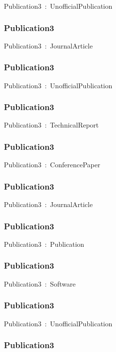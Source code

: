 \documentclass{article}
\begin{document}
Publication3~:~UnofficialPublication

\subsubsection*{Publication3}

Publication3~:~JournalArticle

\subsubsection*{Publication3}

Publication3~:~UnofficialPublication

\subsubsection*{Publication3}

Publication3~:~TechnicalReport

\subsubsection*{Publication3}

Publication3~:~ConferencePaper

\subsubsection*{Publication3}

Publication3~:~JournalArticle

\subsubsection*{Publication3}

Publication3~:~Publication

\subsubsection*{Publication3}

Publication3~:~Software

\subsubsection*{Publication3}

Publication3~:~UnofficialPublication

\subsubsection*{Publication3}
\end{document}
